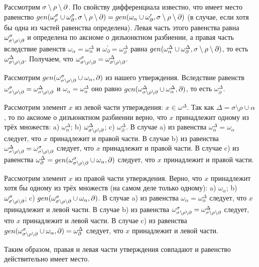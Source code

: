 Рассмотрим $\sigma\setminus\rho\setminus\partial$. По свойству дифференциала известно, что имеет место равенство $gen(\omega^\sigma_\rho \cup \omega^\sigma_\partial, \sigma\setminus\rho\setminus\partial) = gen(\omega_\alpha \cup \omega^\prime_\partial, \sigma\setminus\rho\setminus\partial)$ (в случае, если хотя бы одна из частей равенства определена). Левая часть этого равенства равна $\omega^\sigma_{\sigma\setminus\rho\setminus\partial}$ и определена по аксиоме о дизъюнктном разбиении, а правая часть вследствие равенств $\omega_\alpha = \omega^\Delta_\alpha$ и $\omega^\prime_\partial = \omega^\Delta_\partial$ равна $gen(\omega^\Delta_\alpha \cup \omega^\Delta_\partial, \sigma\setminus\rho\setminus\partial)$, то есть $\omega^\Delta_{\sigma\setminus\rho\setminus\partial}$. Получаем, что $\omega^\sigma_{\sigma\setminus\rho\setminus\partial} = \omega^\Delta_{\sigma\setminus\rho\setminus\partial}$.

Рассмотрим $gen(\omega^\sigma_{\sigma\setminus\rho\setminus\partial} \cup \omega_\alpha, \partial)$ из нашего утверждения. Вследствие равенств $\omega^\sigma_{\sigma\setminus\rho\setminus\partial} = \omega^\Delta_{\sigma\setminus\rho\setminus\partial}$ и $\omega_\alpha = \omega^\Delta_\alpha$ оно равно $gen(\omega^\Delta_{\sigma\setminus\rho\setminus\partial} \cup \omega^\Delta_\alpha, \partial)$, то есть $\omega^\Delta_\partial$.

Рассмотрим элемент $x$ из левой части утверждения: $x \in \omega^\Delta$. Так как $\Delta = \sigma\setminus\rho\cup\alpha$, то по аксиоме о дизъюнктном разбиении верно, что $x$ принадлежит одному из трёх множеств: a) $\omega^\Delta_\alpha$; b) $\omega^\Delta_{\sigma\setminus\rho\setminus\partial}$; c) $\omega^\Delta_\partial$. В случае a) из равенства $\omega^\Delta_\alpha = \omega_\alpha$ следует, что $x$ принадлежит и правой части. В случае b) из равенства $\omega^\Delta_{\sigma\setminus\rho\setminus\partial} = \omega^\sigma_{\sigma\setminus\rho\setminus\partial}$ следует, что $x$ принадлежит и правой части. В случае c) из равенства $\omega^\Delta_\partial = gen(\omega^\sigma_{\sigma\setminus\rho\setminus\partial} \cup \omega_\alpha, \partial)$ следует, что $x$ принадлежит и правой части.

Рассмотрим элемент $x$ из правой части утверждения. Верно, что $x$ принадлежит хотя бы одному из трёх множеств (на самом деле только одному): a) $\omega_\alpha$; b) $\omega^\sigma_{\sigma\setminus\rho\setminus\partial}$; c) $gen(\omega^\sigma_{\sigma\setminus\rho\setminus\partial} \cup \omega_\alpha, \partial)$. В случае a) из равенства $\omega_\alpha = \omega^\Delta_\alpha$ следует, что $x$ принадлежит и левой части. В случае b) из равенства $\omega^\sigma_{\sigma\setminus\rho\setminus\partial} = \omega^\Delta_{\sigma\setminus\rho\setminus\partial}$ следует, что $x$ принадлежит и левой части. В случае c) из равенства $gen(\omega^\sigma_{\sigma\setminus\rho\setminus\partial} \cup \omega_\alpha, \partial) = \omega^\Delta_\partial$ следует, что $x$ принадлежит и левой части.

Таким образом, правая и левая части утверждения совпадают и равенство действительно имеет место.

